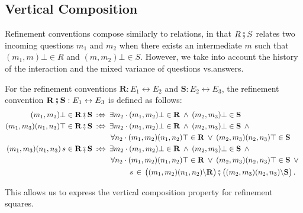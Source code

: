 \documentclass[acmsmall,nonacm]{acmart}
\begin{document}

\subsection{Vertical Composition} %

Refinement conventions compose similarly to relations,
in that $R \fatsemi S$ relates
two incoming questions $m_1$ and $m_2$
when there exists an intermediate $m$ such that
$(m_1,m)\bot \in R$ and
$(m,m_2)\bot \in S$.
However,
we take into account
the history of the interaction and
the mixed variance of questions vs.\@ answers.

\begin{definition}
For the refinement conventions
$\mathbf{R} : E_1 \leftrightarrow E_2$ and
$\mathbf{S} : E_2 \leftrightarrow E_3$,
the refinement convention
$\mathbf{R \fatsemi S} : E_1 \leftrightarrow E_3$
is defined as follows:
\begin{align*}
  (m_1, m_3) \bot \in \mathbf{R} \fatsemi \mathbf{S} \: :\Leftrightarrow \: {}
   &\exists m_2 \cdot
      (m_1, m_2)\bot \in \mathbf{R} \:\wedge\:
      (m_2, m_3)\bot \in \mathbf{S}
  \\%
  (m_1, m_3) (n_1, n_3) \top \in \mathbf{R} \fatsemi \mathbf{S} \::\Leftrightarrow\: {}
   &\exists m_2 \cdot
      (m_1, m_2)\bot \in \mathbf{R} \:\wedge\:
      (m_2, m_3)\bot \in \mathbf{S} \:\wedge\: {} \\
   &\,\forall n_2 \cdot
      (m_1, m_2)(n_1, n_2)\top \in \mathbf{R} \:\vee\:
      (m_2, m_3)(n_2, n_3)\top \in \mathbf{S}
  \\%
  (m_1, m_3) (n_1, n_3) \, s \in \mathbf{R} \fatsemi \mathbf{S} \::\Leftrightarrow\: {}
   &\exists m_2 \cdot
      (m_1, m_2)\bot \in \mathbf{R} \:\wedge\:
      (m_2, m_3)\bot \in \mathbf{S} \:\wedge\: {} \\
   &\,\forall n_2 \cdot
      (m_1, m_2)(n_1, n_2)\top \in \mathbf{R} \:\vee\:
      (m_2, m_3)(n_2, n_3)\top \in \mathbf{S} \:\vee\: {} \\
   &\qquad \:\:\: s \,\in\,
      \bigl( (m_1, m_2) (n_1, n_2) \backslash \mathbf{R} \bigr) \fatsemi
      \bigl( (m_2, m_3) (n_2, n_3) \backslash \mathbf{S} \bigr)
  \,.
\end{align*}
\end{definition}

This allows us to express the vertical composition property
for refinement squares.
\end{document}
